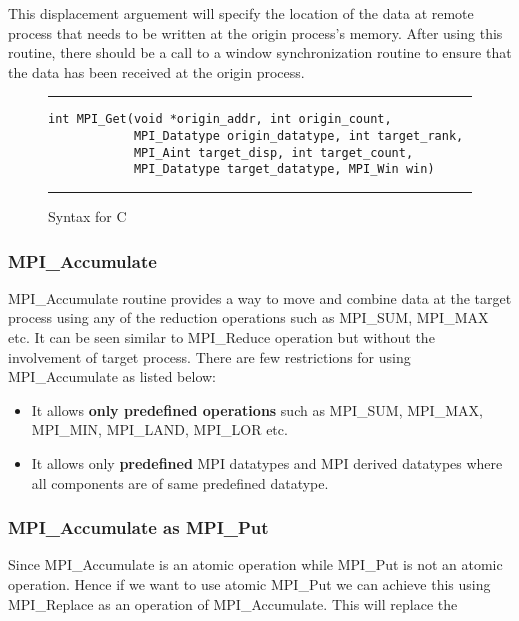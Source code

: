 \documentclass[12pt]{article}
\begin{document}
This displacement arguement will specify the location of the data at remote process that needs to be written at the origin process's memory. After
using this routine, there should be a call to a window synchronization routine to ensure that the data has been received at the origin process.
\begin{figure}[!ht]
\hrule \vspace{5pt}
\begin{verbatim}
int MPI_Get(void *origin_addr, int origin_count, 
            MPI_Datatype origin_datatype, int target_rank,
            MPI_Aint target_disp, int target_count,
            MPI_Datatype target_datatype, MPI_Win win)
\end{verbatim}
\hrule
\caption{Syntax for C}
\end{figure}

\subsubsection{{\ttfamily MPI\_Accumulate}}
{\ttfamily MPI\_Accumulate} routine provides a way to move and combine data at the target process using any of the reduction operations such as
{\ttfamily MPI\_SUM, MPI\_MAX} etc. It can be seen similar to {\ttfamily MPI\_Reduce} operation but without the involvement of target process. There
are few restrictions for using {\ttfamily MPI\_Accumulate} as listed below:
\begin{itemize}
    \item It allows \textbf{only predefined operations} such as {\ttfamily MPI\_SUM, MPI\_MAX, MPI\_MIN, MPI\_LAND, MPI\_LOR} etc.
    \item It allows only \textbf{predefined} MPI datatypes and MPI derived datatypes where all components are of same predefined datatype.
\end{itemize}
\subsubsection{{\ttfamily MPI\_Accumulate as MPI\_Put}}
Since {\ttfamily MPI\_Accumulate} is an atomic operation while {\ttfamily MPI\_Put} is not an atomic operation. Hence if we want to use atomic
{\ttfamily  MPI\_Put} we can achieve this using {\ttfamily MPI\_Replace} as an operation of {\ttfamily MPI\_Accumulate}. This will replace the  
\end{document}

